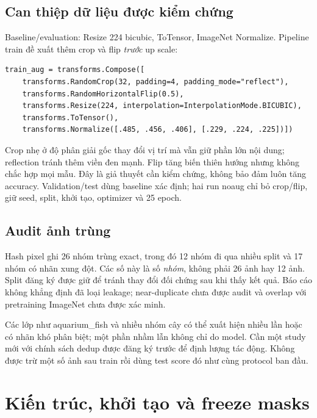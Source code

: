 \documentclass[11pt,a4paper]{article}
\begin{document}
\subsection{Can thiệp dữ liệu được kiểm chứng}
Baseline/evaluation: Resize 224 bicubic, ToTensor, ImageNet Normalize. Pipeline train đề xuất thêm crop và flip \emph{trước} up scale:
\begin{lstlisting}
train_aug = transforms.Compose([
    transforms.RandomCrop(32, padding=4, padding_mode="reflect"),
    transforms.RandomHorizontalFlip(0.5),
    transforms.Resize(224, interpolation=InterpolationMode.BICUBIC),
    transforms.ToTensor(),
    transforms.Normalize([.485, .456, .406], [.229, .224, .225])])
\end{lstlisting}
Crop nhẹ ở độ phân giải gốc thay đổi vị trí mà vẫn giữ phần lớn nội dung; reflection tránh thêm viền đen mạnh. Flip tăng biến thiên hướng nhưng không chắc hợp mọi mẫu. Đây là giả thuyết cần kiểm chứng, không bảo đảm luôn tăng accuracy. Validation/test dùng baseline xác định; hai run noaug chỉ bỏ crop/flip, giữ seed, split, khởi tạo, optimizer và 25 epoch.

\subsection{Audit ảnh trùng}
Hash pixel ghi 26 nhóm trùng exact, trong đó 12 nhóm đi qua nhiều split và 17 nhóm có nhãn xung đột. Các số này là số \emph{nhóm}, không phải 26 ảnh hay 12 ảnh. Split đăng ký được giữ để tránh thay đổi đối chứng sau khi thấy kết quả. Báo cáo không khẳng định đã loại leakage; near-duplicate chưa được audit và overlap với pretraining ImageNet chưa được xác minh.

Các lớp như aquarium\_fish và nhiều nhóm cây có thể xuất hiện nhiều lần hoặc có nhãn khó phân biệt; một phần nhầm lẫn không chỉ do model. Cần một study mới với chính sách dedup được đăng ký trước để định lượng tác động. Không được trừ một số ảnh sau train rồi dùng test score đó như cùng protocol ban đầu.
\clearpage

\section{Kiến trúc, khởi tạo và freeze masks}\label{sec:models}
\end{document}
